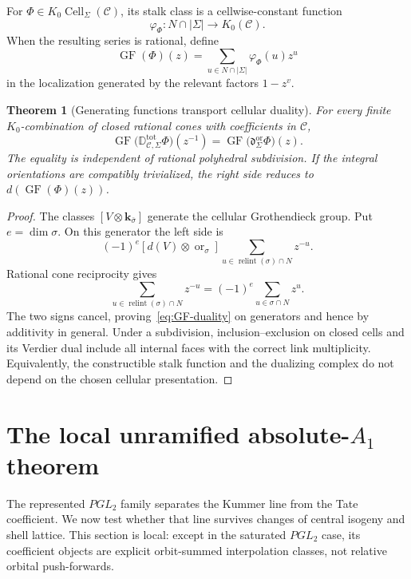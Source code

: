 \documentclass[11pt]{article}
\newtheorem{theorem}{Theorem}[section]
\theoremstyle{definition}
\theoremstyle{remark}
\newcommand{\cC}{\mathcal C}
\newcommand{\D}{\mathbb D}
\newcommand{\GF}{\operatorname{GF}}
\newcommand{\Cell}{\operatorname{Cell}}
\newcommand{\relint}{\operatorname{relint}}
\begin{document}
For $\Phi\in K_0\Cell_\Sigma(\cC)$, its stalk class is a cellwise-constant
function
\[
 \varphi_\Phi:N\cap|\Sigma|\longrightarrow K_0(\cC).
\]
When the resulting series is rational, define
\begin{equation}
 \GF(\Phi)(z)=
 \sum_{u\in N\cap|\Sigma|}\varphi_\Phi(u)z^u
 \label{eq:GF-definition}
\end{equation}
in the localization generated by the relevant factors $1-z^v$.

\begin{theorem}[Generating functions transport cellular duality]
\label{thm:GF-duality}
For every finite $K_0$-combination of closed rational cones with coefficients
in $\cC$,
\begin{equation}
 \boxed{
 \GF\bigl(\D^{\mathrm{tot}}_{\cC,\Sigma}\Phi\bigr)(z^{-1})
 =\GF\bigl(\mathfrak d^{\operatorname{or}}_\Sigma\Phi\bigr)(z).}
 \label{eq:GF-duality}
\end{equation}
The equality is independent of rational polyhedral subdivision.
If the integral orientations are compatibly trivialized, the right side
reduces to $d(\GF(\Phi)(z))$.
\end{theorem}

\begin{proof}
The classes $[V\otimes\mathbf k_{\bar\sigma}]$ generate the cellular
Grothendieck group.  Put $e=\dim\sigma$.  On this generator the left side is
\[
 (-1)^e[d(V)\otimes\operatorname{or}_\sigma]
 \sum_{u\in\relint(\sigma)\cap N}z^{-u}.
\]
Rational cone reciprocity \cite{Stanley} gives
\[
 \sum_{u\in\relint(\sigma)\cap N}z^{-u}
 =(-1)^e\sum_{u\in\sigma\cap N}z^u.
\]
The two signs cancel, proving~\eqref{eq:GF-duality} on generators and hence
by additivity in general.  Under a subdivision, inclusion--exclusion on
closed cells and its Verdier dual include all internal faces with the
correct link multiplicity.  Equivalently, the constructible stalk function
and the dualizing complex do not depend on the chosen cellular presentation.
\end{proof}


\section{The local unramified absolute-\texorpdfstring{$A_1$}{A1} theorem}
\label{sec:absolute-A1}

The represented $PGL_2$ family separates the Kummer line from the Tate
coefficient.  We now test whether that line survives changes of central
isogeny and shell lattice.  This section is local: except in the saturated
$PGL_2$ case, its coefficient objects are explicit orbit-summed
interpolation classes, not relative orbital push-forwards.
\end{document}
